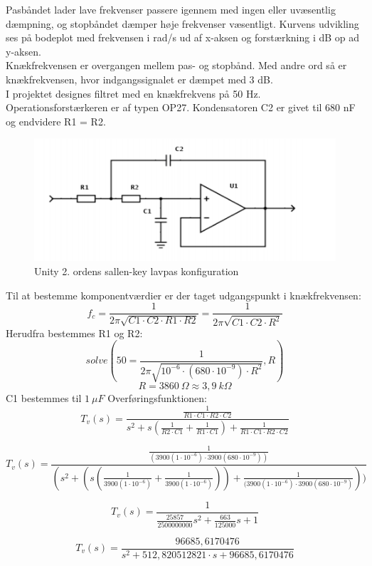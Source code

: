 Pasbåndet lader lave frekvenser passere igennem med ingen eller uvæsentlig dæmpning, og stopbåndet dæmper høje frekvenser væsentligt. Kurvens udvikling ses på bodeplot med frekvensen i rad/s ud af x-aksen og forstærkning i dB op ad y-aksen. \\
\newline
Knækfrekvensen er overgangen mellem pas- og stopbånd. Med andre ord så er knækfrekvensen, hvor indgangssignalet er dæmpet med 3 dB. \\
\newline
I projektet designes filtret med en knækfrekvens på 50 Hz. Operationsforstærkeren er af typen OP27. Kondensatoren C2 er givet til 680 nF og endvidere R1 = R2. 

\begin{figure}[H]
\centering
\includegraphics[scale=0.60]{opamp.PNG}
\caption{Unity 2. ordens sallen-key lavpas konfiguration}
\end{figure}

Til at bestemme komponentværdier er der taget udgangspunkt i knækfrekvensen:
$$f_c=\frac{1}{2 \pi \sqrt{C1 \cdot C2 \cdot R1 \cdot R2}} = \frac{1}{2 \pi \sqrt{C1 \cdot C2 \cdot R^2}}$$
Herudfra bestemmes R1 og R2:
$$solve(50=\frac{1}{2 \pi \sqrt{10^{-6} \cdot (680 \cdot 10^{-9}) \cdot R^2}},R)$$
$$R=3860 \ \Omega \approx 3,9 \ k \Omega$$
C1 bestemmes til $1 \ \mu F$
Overføringsfunktionen:
$$T_v(s)=\frac{\frac{1}{R1 \cdot C1 \cdot R2 \cdot C2}}{s^2+s(\frac{1}{R2 \cdot C1}+\frac{1}{R1 \cdot C1})+\frac{1}{R1 \cdot C1 \cdot R2 \cdot C2}}$$

$$T_v(s)=\frac{\frac{1}{(3900(1 \cdot 10^{-6}) \cdot 3900  (680 \cdot 10^{-9}))}}{(s^2+(s(\frac{1}{3900(1 \cdot 10^{-6})}+ \frac{1}{3900(1 \cdot 10^{-6})}))+\frac{1}{(3900(1 \cdot 10^{-6}) \cdot 3900 (680 \cdot 10^{-9})}))}$$

$$T_v(s)=\frac{1}{\frac{25857}{2500000000}s^2 + \frac{663}{125000}s+1}$$

$$T_v(s)=\frac{96685,6170476}{s^2+512,820512821 \cdot s+96685,6170476}$$

